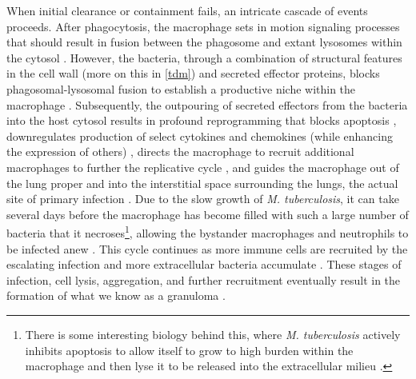 When initial clearance or containment fails, an intricate cascade of events proceeds. After phagocytosis, the macrophage sets in motion signaling processes that should result in fusion between the phagosome and extant lysosomes within the cytosol \citep{Abramovitch2011}. However, the bacteria, through a combination of structural features in the cell wall (more on this in \autoref{tdm}) and secreted effector proteins, blocks phagosomal\hyp{}lysosomal fusion to establish a productive niche within the macrophage \citep{McDonough1993, Pieters2008, Casonato2014}. Subsequently, the outpouring of secreted effectors from the bacteria into the host cytosol results in profound reprogramming that blocks apoptosis \citep{Ahluwalia2017, Keane1997, Keane2000, Maueroder2016, Yokobori2012, Beckham2017, Wong2017a}, downregulates production of select cytokines and chemokines (while enhancing the expression of others) \citep{Cambier2014a, Fortune2004, MadanLala2011}, directs the macrophage to recruit additional macrophages to further the replicative cycle \citep{Appelberg2015, Pagan2015, Cambier2014b}, and guides the macrophage out of the lung proper and into the interstitial space surrounding the lungs, the actual site of primary infection \citep{Peters2003, Upadhyay2018, Ramakrishnan2012, Cohen2018}. Due to the slow growth of \textit{M. tuberculosis}, it can take several days before the macrophage has become filled with such a large number of bacteria that it necroses\footnote{There is some interesting biology behind this, where \textit{M. tuberculosis} actively inhibits apoptosis to allow itself to grow to high burden within the macrophage and then lyse it to be released into the extracellular milieu \citep{Keane2000}.}, allowing the bystander macrophages and neutrophils to be infected anew \citep{BanosMateos2017}. This cycle continues as more immune cells are recruited by the escalating infection and more extracellular bacteria accumulate \citep{Cadena2016, Lin2006a, Corleis2020, Orme2014a}. These stages of infection, cell lysis, aggregation, and further recruitment eventually result in the formation of what we know as a granuloma \citep{Ramakrishnan2012, Pagan2018}. 

